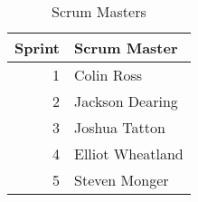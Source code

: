 \begin{spacing}{1.3}
\begin{table}[htbp]
    \centering
    \begin{tabular}{@{}r|l@{}}
    \toprule
        \textbf{Sprint} & \textbf{Scrum Master} \\
        \hline
        1 & Colin Ross \\
        2 & Jackson Dearing\\
        3 & Joshua Tatton\\
        4 & Elliot Wheatland\\
        5 & Steven Monger\\
        \bottomrule
    \end{tabular}
    \caption{Scrum Masters}
    \label{tab:scrumMasters}
\end{table}

\end{spacing}